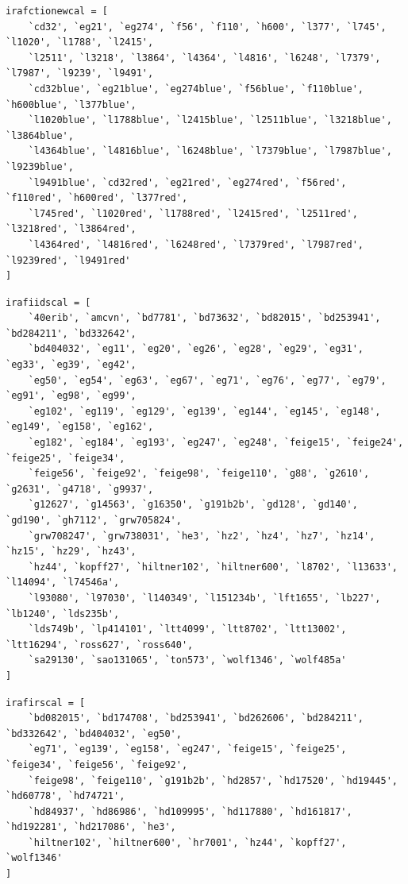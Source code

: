 \documentclass[twocolumn, linenumbers]{aastex631}
\begin{document}
\begin{verbatim}
irafctionewcal = [
    `cd32', `eg21', `eg274', `f56', `f110', `h600', `l377', `l745', `l1020', `l1788', `l2415',
    `l2511', `l3218', `l3864', `l4364', `l4816', `l6248', `l7379', `l7987', `l9239', `l9491',
    `cd32blue', `eg21blue', `eg274blue', `f56blue', `f110blue', `h600blue', `l377blue',
    `l1020blue', `l1788blue', `l2415blue', `l2511blue', `l3218blue', `l3864blue',
    `l4364blue', `l4816blue', `l6248blue', `l7379blue', `l7987blue', `l9239blue',
    `l9491blue', `cd32red', `eg21red', `eg274red', `f56red', `f110red', `h600red', `l377red',
    `l745red', `l1020red', `l1788red', `l2415red', `l2511red', `l3218red', `l3864red',
    `l4364red', `l4816red', `l6248red', `l7379red', `l7987red', `l9239red', `l9491red'
]
\end{verbatim}

\begin{verbatim}
irafiidscal = [
    `40erib', `amcvn', `bd7781', `bd73632', `bd82015', `bd253941', `bd284211', `bd332642',
    `bd404032', `eg11', `eg20', `eg26', `eg28', `eg29', `eg31', `eg33', `eg39', `eg42',
    `eg50', `eg54', `eg63', `eg67', `eg71', `eg76', `eg77', `eg79', `eg91', `eg98', `eg99',
    `eg102', `eg119', `eg129', `eg139', `eg144', `eg145', `eg148', `eg149', `eg158', `eg162',
    `eg182', `eg184', `eg193', `eg247', `eg248', `feige15', `feige24', `feige25', `feige34',
    `feige56', `feige92', `feige98', `feige110', `g88', `g2610', `g2631', `g4718', `g9937',
    `g12627', `g14563', `g16350', `g191b2b', `gd128', `gd140', `gd190', `gh7112', `grw705824',
    `grw708247', `grw738031', `he3', `hz2', `hz4', `hz7', `hz14', `hz15', `hz29', `hz43',
    `hz44', `kopff27', `hiltner102', `hiltner600', `l8702', `l13633', `l14094', `l74546a',
    `l93080', `l97030', `l140349', `l151234b', `lft1655', `lb227', `lb1240', `lds235b',
    `lds749b', `lp414101', `ltt4099', `ltt8702', `ltt13002', `ltt16294', `ross627', `ross640',
    `sa29130', `sao131065', `ton573', `wolf1346', `wolf485a'
]
\end{verbatim}

\begin{verbatim}
irafirscal = [
    `bd082015', `bd174708', `bd253941', `bd262606', `bd284211', `bd332642', `bd404032', `eg50',
    `eg71', `eg139', `eg158', `eg247', `feige15', `feige25', `feige34', `feige56', `feige92',
    `feige98', `feige110', `g191b2b', `hd2857', `hd17520', `hd19445', `hd60778', `hd74721',
    `hd84937', `hd86986', `hd109995', `hd117880', `hd161817', `hd192281', `hd217086', `he3',
    `hiltner102', `hiltner600', `hr7001', `hz44', `kopff27', `wolf1346'
]
\end{verbatim}
\end{document}
